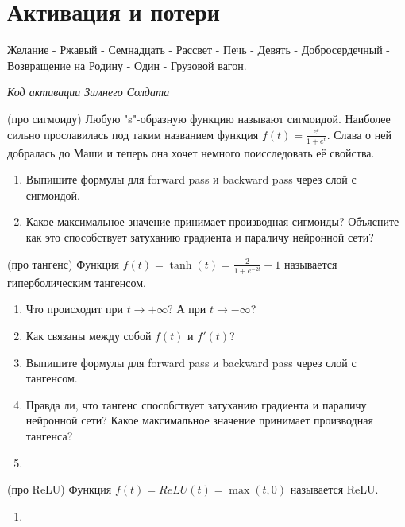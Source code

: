 
\section*{Активация и потери} 

\epigraph{Желание - Ржавый - Семнадцать - Рассвет - Печь - Девять - Добросердечный - Возвращение на Родину - Один - Грузовой вагон.}{\textit{Код активации Зимнего Солдата}}


\begin{problem}{(про сигмоиду)}
Любую "s"-образную функцию называют сигмоидой. Наиболее сильно прославилась под таким названием функция $f(t) = \frac{e^t}{1 + e^t}.$ Слава о ней добралась до Маши и теперь она хочет немного поисследовать её свойства. 

\begin{enumerate}
	\item Выпишите формулы для forward pass и backward pass через слой с сигмоидой. 
	\item Какое максимальное значение принимает производная сигмоиды? Объясните как это способствует затуханию градиента и параличу нейронной сети?  
	\end{enumerate}
\end{problem} 


\begin{problem}{(про тангенс)}
	Функция $f(t) = \tanh(t) = \frac{2}{1 + e^{-2t}} - 1$ называется гиперболическим тангенсом.
	\begin{enumerate}
		\item Что происходит при $t \to +\infty$? А при $t \to -\infty$?
		\item Как связаны между собой $f(t)$ и  $f'(t)$?
		\item Выпишите формулы для forward pass и backward pass через слой с тангенсом. 
		\item Правда ли, что тангенс способствует затуханию градиента и параличу нейронной сети? Какое максимальное значение принимает производная тангенса? 
		\item {}
	\end{enumerate}
\end{problem} 


\begin{problem}{(про ReLU)}
	Функция $f(t) = ReLU(t) = \max(t, 0)$ называется ReLU.
	\begin{enumerate}
        \item 
	\end{enumerate}
\end{problem} 


